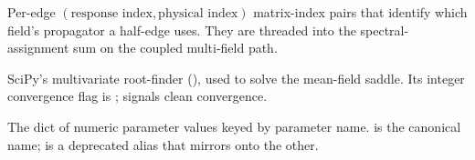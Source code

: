 \begin{description}[leftmargin=0pt,style=nextline]
  \item[\code{fpairs} / \code{propagator\_indices}] Per-edge
        $(\text{response index},\text{physical index})$ matrix-index pairs that
        identify which field's propagator a half-edge uses. They are threaded into
        the spectral-assignment sum on the coupled multi-field path.

  \item[\code{fsolve}] SciPy's multivariate root-finder
        (), used to solve the mean-field saddle. Its
        integer convergence flag is ;  signals clean
        convergence.

  \item[\code{fundamental} / \code{parameters}] The dict of numeric parameter
        values keyed by parameter name.  is the canonical name;
         is a deprecated alias that 
        mirrors onto the other.

\end{description}

